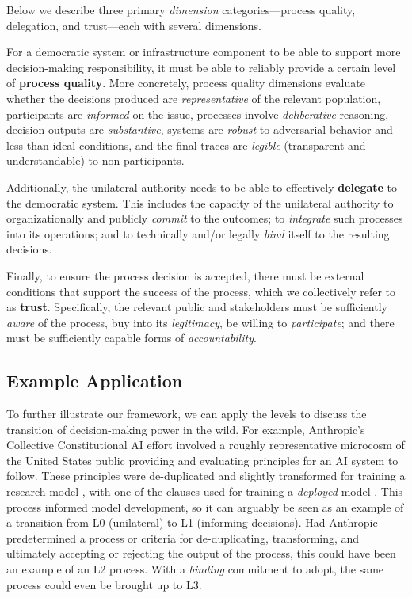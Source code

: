 \documentclass{article}
\begin{document}
    Below we describe three primary \textit{dimension} categories---process quality, delegation, and trust---each with several dimensions.

    For a democratic system or infrastructure component to be able to support more decision-making responsibility, it must be able to reliably provide a certain level of \textbf{process quality}.
    More concretely, process quality dimensions evaluate whether the decisions produced are \emph{representative} of the relevant population, participants are \emph{informed} on the issue, processes involve \textit{deliberative} reasoning, decision outputs are \emph{substantive}, systems are \emph{robust} to adversarial behavior and less-than-ideal conditions, and the final traces are \emph{legible} (transparent and understandable) to non-participants.

    Additionally, the unilateral authority needs to be able to effectively \textbf{delegate} to the democratic system. This includes the capacity of the unilateral authority to organizationally and publicly \emph{commit} to the outcomes; to \emph{integrate} such processes into its operations; and to technically and/or legally \emph{bind} itself to the resulting decisions.
    
    Finally, to ensure the process decision is accepted, there must be external conditions that support the success of the process, which we collectively refer to as \textbf{trust}. Specifically, the relevant public and stakeholders must be sufficiently \textit{aware} of the process, buy into its \emph{legitimacy}, be willing to \emph{participate}; and there must be sufficiently capable forms of \emph{accountability}.

\subsection{Example Application}
\label{sec:framework-examples}

    To further illustrate our framework, we can apply the levels to discuss the transition of decision-making power in the wild. For example, Anthropic's Collective Constitutional AI \cite{anthropic2023} effort involved a roughly representative microcosm of the United States public providing and evaluating principles for an AI system to follow. 
    These principles were de-duplicated and slightly transformed for training a research model \cite{anthropic2023}, with one of the clauses used for training a \textit{deployed} model \cite{sonnet-system-card}.
    This process informed model development, so it can arguably be seen as an example of a transition from L0 (unilateral) to L1 (informing decisions).
    Had Anthropic predetermined a process or criteria for de-duplicating, transforming, and ultimately accepting or rejecting the output of the process, this could have been an example of an L2 process.
    With a \textit{binding} commitment to adopt, the same process could even be brought up to L3.
    
\end{document}
